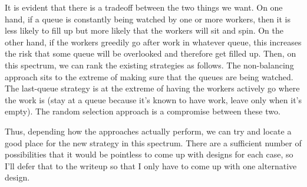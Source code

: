 \documentclass{article}
\begin{document}
It is evident that there is a tradeoff between the two things we want. On one hand, if a queue is constantly being watched by one or more workers, then it is less likely to fill up but more likely that the workers will sit and spin. On the other hand, if the workers greedily go after work in whatever queue, this increases the risk that some queue will be overlooked and therefore get filled up. Then, on this spectrum, we can rank the existing strategies as follows. The non-balancing approach sits to the extreme of making sure that the queues are being watched. The last-queue strategy is at the extreme of having the workers actively go where the work is (stay at a queue because it's known to have work, leave only when it's empty). The random selection approach is a compromise between these two.

Thus, depending how the approaches actually perform, we can try and locate a good place for the new strategy in this spectrum. There are a sufficient number of possibilities that it would be pointless to come up with designs for each case, so I'll defer that to the writeup so that I only have to come up with one alternative design.
\end{document}
